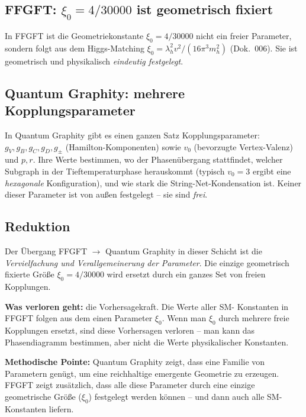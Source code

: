 \subsection{\texorpdfstring{FFGFT: $\xi_0 = 4/30000$ ist geometrisch fixiert}{FFGFT: xi0 = 4/30000 ist geometrisch fixiert}}

In FFGFT ist die Geometriekonstante $\xi_0 = 4/30000$ nicht ein
freier Parameter, sondern folgt aus dem Higgs-Matching
$\xi_0 = \lambda_h^2 v^2/(16\pi^3 m_h^2)$ (Dok.~006). Sie ist
geometrisch und physikalisch \emph{eindeutig festgelegt}.

\subsection{Quantum Graphity: mehrere Kopplungsparameter}

In Quantum Graphity gibt es einen ganzen Satz Kopplungsparameter:
$g_V, g_B, g_C, g_D, g_\pm$ (Hamilton-Komponenten) sowie $v_0$
(bevorzugte Vertex-Valenz) und $p, r$. Ihre Werte bestimmen, wo der
Phasenübergang stattfindet, welcher Subgraph in der Tieftemperaturphase
herauskommt (typisch $v_0 = 3$ ergibt eine \emph{hexagonale} Konfiguration),
und wie stark die String-Net-Kondensation ist. Keiner dieser
Parameter ist von außen festgelegt -- sie sind \emph{frei}.

\subsection{Reduktion}

Der Übergang FFGFT $\to$ Quantum Graphity in dieser Schicht ist die
\emph{Vervielfachung und Verallgemeinerung der Parameter}. Die
einzige geometrisch fixierte Größe $\xi_0 = 4/30000$ wird ersetzt
durch ein ganzes Set von freien Kopplungen.

\textbf{Was verloren geht:} die Vorhersagekraft. Die Werte aller SM-
Konstanten in FFGFT folgen aus dem einen Parameter $\xi_0$. Wenn man
$\xi_0$ durch mehrere freie Kopplungen ersetzt, sind diese
Vorhersagen verloren -- man kann das Phasendiagramm bestimmen, aber
nicht die Werte physikalischer Konstanten.

\textbf{Methodische Pointe:} Quantum Graphity zeigt, dass eine
Familie von Parametern genügt, um eine reichhaltige emergente
Geometrie zu erzeugen. FFGFT zeigt zusätzlich, dass alle diese
Parameter durch eine einzige geometrische Größe ($\xi_0$) festgelegt
werden können -- und dann auch alle SM-Konstanten liefern.

